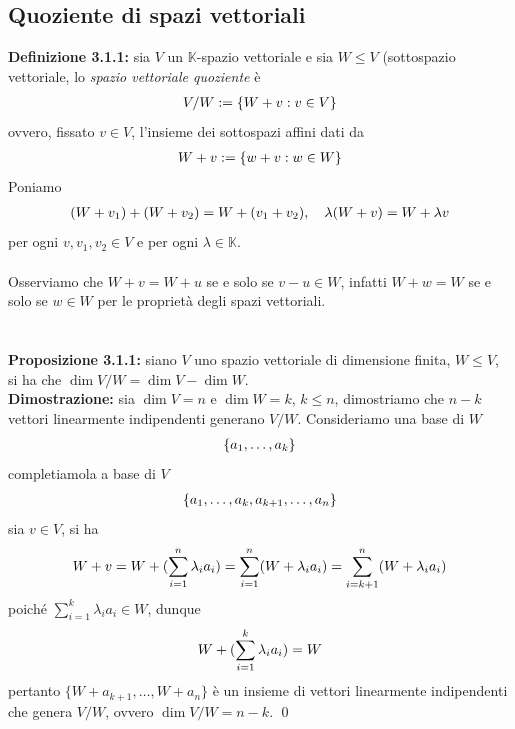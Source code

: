 \documentclass{article}
\begin{document}
\subsection{Quoziente di spazi vettoriali}
\textbf{Definizione 3.1.1:} sia $V$ un $\mathbb{K}$-spazio vettoriale e sia $W \leq V$ (sottospazio vettoriale, lo \textit{spazio vettoriale quoziente} è
\begin{gather}
    V/W := \{ W + v : v \in V \} \notag
\end{gather}
ovvero, fissato $v \in V$, l'insieme dei sottospazi affini dati da
\begin{gather}
    W + v := \{ w + v : w \in W \} \notag
\end{gather}
Poniamo
\begin{gather}
    (W + v_1) + (W + v_2) = W + (v_1 + v_2), \quad \lambda(W + v) = W + \lambda v \notag
\end{gather}
per ogni $v, v_1, v_2 \in V$ e per ogni $\lambda \in \mathbb{K}$. \\ \\
Osserviamo che $W + v = W + u$ se e solo se $v - u \in W$, infatti $W + w = W$ se e solo se $w \in W$ per le proprietà degli spazi vettoriali. \\ \\ \\
\textbf{Proposizione 3.1.1:} siano $V$ uno spazio vettoriale di dimensione finita, $W \leq V$, si ha che $\dim V/W = \dim V - \dim W$. \\

\textbf{Dimostrazione:} sia $\dim V = n$ e $\dim W = k$, $k \leq n$, dimostriamo che $n - k$ vettori linearmente indipendenti generano $V/W$. Consideriamo una base di $W$
\begin{gather}
    \{ a_1, \dots, a_k \} \notag
\end{gather}
completiamola a base di $V$
\begin{gather}
    \{ a_1, \dots, a_k, a_{k + 1}, \dots, a_n \} \notag
\end{gather}
sia $v \in V$, si ha
\begin{gather}
    W + v = W + (\sum_{i = 1}^n \lambda_i a_i) = \sum_{i = 1}^n (W + \lambda_i a_i) = \sum_{i = k + 1}^n (W + \lambda_ia_i) \notag 
\end{gather}
poiché $\sum_{i = 1}^k \lambda_i a_i \in W$, dunque
\begin{gather}
    W + (\sum_{i = 1}^k \lambda_i a_i) = W \notag
\end{gather}
pertanto $\{ W + a_{k + 1}, \dots, W + a_n \}$ è un insieme di vettori linearmente indipendenti che genera $V/W$, ovvero $\dim V/W = n - k$. \qed
\end{document}
